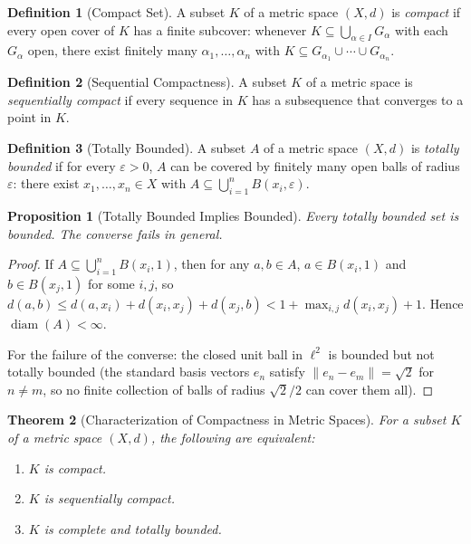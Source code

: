 \documentclass[11pt,a4paper]{article}
\theoremstyle{definition}
\newtheorem{definition}{Definition}[section]
\theoremstyle{plain}
\newtheorem{theorem}{Theorem}[section]
\newtheorem{proposition}[theorem]{Proposition}
\theoremstyle{remark}
\DeclareMathOperator{\diam}{diam}
\begin{document}
\begin{definition}[Compact Set]
\label{def:compact}
A subset $K$ of a metric space $(X,d)$ is \emph{compact} if every open cover of
$K$ has a finite subcover: whenever $K \subseteq \bigcup_{\alpha \in I} G_\alpha$
with each $G_\alpha$ open, there exist finitely many $\alpha_1, \ldots, \alpha_n$
with $K \subseteq G_{\alpha_1} \cup \cdots \cup G_{\alpha_n}$.
\end{definition}

\begin{definition}[Sequential Compactness]
\label{def:seq_compact}
A subset $K$ of a metric space is \emph{sequentially compact} if every sequence in
$K$ has a subsequence that converges to a point in $K$.
\end{definition}

\begin{definition}[Totally Bounded]
\label{def:totally_bounded}
A subset $A$ of a metric space $(X,d)$ is \emph{totally bounded} if for every
$\varepsilon > 0$, $A$ can be covered by finitely many open balls of radius
$\varepsilon$: there exist $x_1, \ldots, x_n \in X$ with
$A \subseteq \bigcup_{i=1}^n B(x_i, \varepsilon)$.
\end{definition}

\begin{proposition}[Totally Bounded Implies Bounded]
\label{prop:tb_bounded}
Every totally bounded set is bounded. The converse fails in general.
\end{proposition}

\begin{proof}
If $A \subseteq \bigcup_{i=1}^n B(x_i, 1)$, then for any $a, b \in A$, $a \in B(x_i, 1)$
and $b \in B(x_j, 1)$ for some $i, j$, so $d(a,b) \le d(a, x_i) + d(x_i, x_j) +
d(x_j, b) < 1 + \max_{i,j} d(x_i, x_j) + 1$. Hence $\diam(A) < \infty$.

For the failure of the converse: the closed unit ball in $\ell^2$ is bounded but not
totally bounded (the standard basis vectors $e_n$ satisfy $\|e_n - e_m\| = \sqrt{2}$
for $n \ne m$, so no finite collection of balls of radius $\sqrt{2}/2$ can cover them all).
\end{proof}

\begin{theorem}[Characterization of Compactness in Metric Spaces]
\label{thm:compact_equiv}
For a subset $K$ of a metric space $(X,d)$, the following are equivalent:
\begin{enumerate}[nosep,label=(\roman*)]
    \item $K$ is compact.
    \item $K$ is sequentially compact.
    \item $K$ is complete and totally bounded.
\end{enumerate}
\end{theorem}
\end{document}

